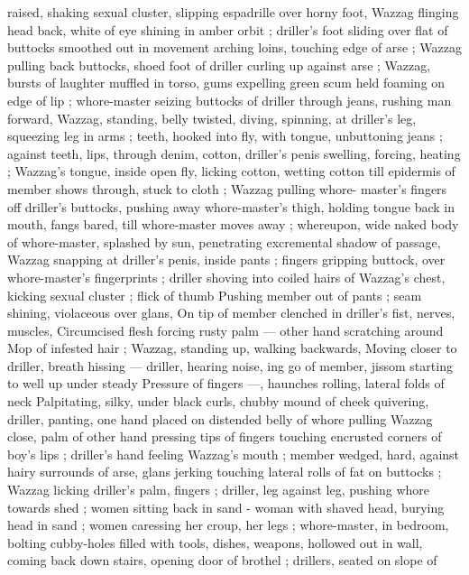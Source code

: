 raised, shaking sexual cluster, slipping espadrille over horny foot, 
Wazzag flinging head back, white of eye shining in amber orbit ; 
driller's foot sliding over flat of buttocks smoothed out in movement 
arching loins, touching edge of arse ; Wazzag pulling back buttocks, 
shoed foot of driller curling up against arse ; Wazzag, bursts of 
laughter muffled in torso, gums expelling green scum held foaming 
on edge of lip ; whore-master seizing buttocks of driller through 
jeans, rushing man forward, Wazzag, standing, belly twisted, diving, 
spinning, at driller's leg, squeezing leg in arms ; teeth, hooked into 
fly, with tongue, unbuttoning jeans ; against teeth, lips, through 
denim, cotton, driller's penis swelling, forcing, heating ; Wazzag's 
tongue, inside open fly, licking cotton, wetting cotton till epidermis 
of member shows through, stuck to cloth ; Wazzag pulling whore- 
master's fingers off driller's buttocks, pushing away whore-master's 
thigh, holding tongue back in mouth, fangs bared, till whore-master 
moves away ; whereupon, wide naked body of whore-master, 
splashed by sun, penetrating excremental shadow of passage, 
Wazzag snapping at driller's penis, inside pants ; fingers gripping 
buttock, over whore-master's fingerprints ; driller shoving into coiled 
hairs of Wazzag's chest, kicking sexual cluster ; flick of thumb 
Pushing member out of pants ; seam shining, violaceous over glans, 
On tip of member clenched in driller's fist, nerves, muscles, 
Circumcised flesh forcing rusty palm --- other hand scratching around 
Mop of infested hair ; Wazzag, standing up, walking backwards, 
Moving closer to driller, breath hissing --- driller, hearing noise, 
ing go of member, jissom starting to well up under steady 
Pressure of fingers ---, haunches rolling, lateral folds of neck 
Palpitating, silky, under black curls, chubby mound of cheek 
quivering, driller, panting, one hand placed on distended belly of 
whore pulling Wazzag close, palm of other hand pressing tips of 
fingers touching encrusted corners of boy's lips ; driller's hand 
feeling Wazzag's mouth ; member wedged, hard, against hairy 
surrounds of arse, glans jerking touching lateral rolls of fat on 
buttocks ; Wazzag licking driller's palm, fingers ; driller, leg against 
leg, pushing whore towards shed ; women sitting back in sand - 
woman with shaved head, burying head in sand ; women caressing 
her croup, her legs ; whore-master, in bedroom, bolting cubby-holes 
filled with tools, dishes, weapons, hollowed out in wall, coming back 
down stairs, opening door of brothel ; drillers, seated on slope of 
